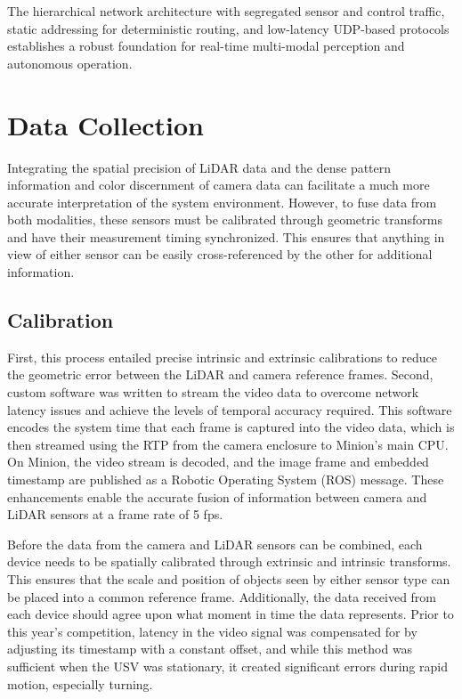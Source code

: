 The hierarchical network architecture with segregated sensor and control traffic, static addressing for deterministic routing, and low-latency \ac{UDP}-based protocols establishes a robust foundation for real-time multi-modal perception and autonomous operation.

\section{Data Collection}

Integrating the spatial precision of LiDAR data and the dense pattern information and color discernment of camera data can facilitate a much more accurate interpretation of the system environment. However, to fuse data from both modalities, these sensors must be calibrated through geometric transforms and have their measurement timing synchronized. This ensures that anything in view of either sensor can be easily cross-referenced by the other for additional information.
    
\subsection{Calibration}

First, this process entailed precise intrinsic and extrinsic calibrations to reduce the geometric error between the LiDAR and camera reference frames. 
Second, custom software was written to stream the video data to overcome network latency issues and achieve the levels of temporal accuracy required. 
This software encodes the system time that each frame is captured into the video data, which is then streamed using the \ac{RTP} from the camera enclosure to Minion's main CPU. 
On Minion, the video stream is decoded, and the image frame and embedded timestamp are published as a Robotic Operating System (ROS) message. 
These enhancements enable the accurate fusion of information between camera and LiDAR sensors at a frame rate of 5 fps.

Before the data from the camera and LiDAR sensors can be combined, each device needs to be spatially calibrated through extrinsic and intrinsic transforms. 
This ensures that the scale and position of objects seen by either sensor type can be placed into a common reference frame. 
Additionally, the data received from each device should agree upon what moment in time the data represents. 
Prior to this year's competition, latency in the video signal was compensated for by adjusting its timestamp with a constant offset, and while this method was sufficient when the USV was stationary, it created significant errors during rapid motion, especially turning.

